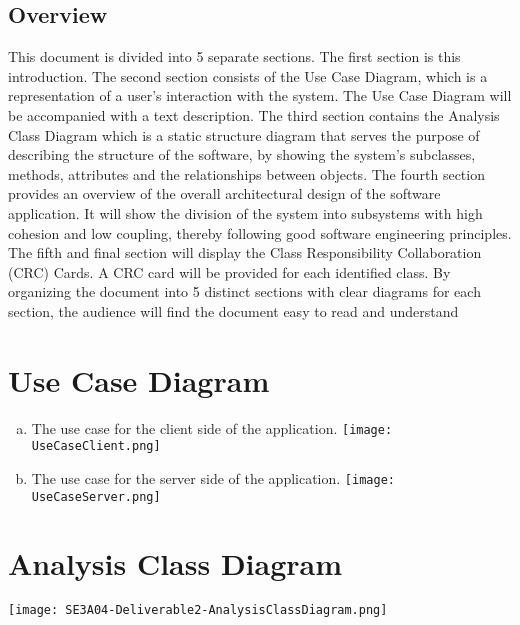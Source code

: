 \documentclass[]{article}
\begin{document}
\subsection{Overview}
\label{sub:overview}
This document is divided into 5 separate sections. The first section is this introduction. The second section consists of the Use Case Diagram, which is a representation of a user’s interaction with the system. The Use Case Diagram will be accompanied with a text description. The third section contains the Analysis Class Diagram which is a static structure diagram that serves the purpose of describing the structure of the software, by showing the system’s subclasses, methods, attributes and the relationships between objects. The fourth section provides an overview of the overall architectural design of the software application. It will show the division of the system into subsystems with high cohesion and low coupling, thereby following good software engineering principles. 
The fifth and final section will display the Class Responsibility Collaboration (CRC) Cards. A CRC card will be provided for each identified class. By organizing the document into 5 distinct sections with clear diagrams for each section, the audience will find the document easy to read and understand


\section{Use Case Diagram}
\label{sec:use_case_diagram}
\begin{enumerate}[a)]
	\item The use case for the client side of the application.\newline
	\texttt{[image: UseCaseClient.png]}
	\newpage
	\item The use case for the server side of the application.\newline
	\texttt{[image: UseCaseServer.png]}
\end{enumerate}

\section{Analysis Class Diagram}
\label{sec:analysis_class_diagram}
\texttt{[image: SE3A04-Deliverable2-AnalysisClassDiagram.png]}
\end{document}

